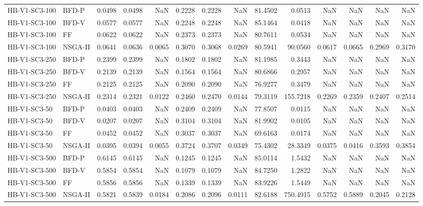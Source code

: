 \begin{tabular}{llrrrrrrrrrrrr}
HB-V1-SC3-100 & BFD-P & 0.0498 & 0.0498 & NaN & 0.2228 & 0.2228 & NaN & 81.4502 & 0.0513 & NaN & NaN & NaN & NaN \\
HB-V1-SC3-100 & BFD-V & 0.0577 & 0.0577 & NaN & 0.2248 & 0.2248 & NaN & 85.1464 & 0.0418 & NaN & NaN & NaN & NaN \\
HB-V1-SC3-100 & FF & 0.0622 & 0.0622 & NaN & 0.2373 & 0.2373 & NaN & 80.7611 & 0.0534 & NaN & NaN & NaN & NaN \\
HB-V1-SC3-100 & NSGA-II & 0.0641 & 0.0636 & 0.0065 & 0.3070 & 0.3068 & 0.0269 & 80.5941 & 90.0560 & 0.0617 & 0.0665 & 0.2969 & 0.3170 \\
HB-V1-SC3-250 & BFD-P & 0.2399 & 0.2399 & NaN & 0.1802 & 0.1802 & NaN & 81.1985 & 0.3443 & NaN & NaN & NaN & NaN \\
HB-V1-SC3-250 & BFD-V & 0.2139 & 0.2139 & NaN & 0.1564 & 0.1564 & NaN & 80.6866 & 0.2957 & NaN & NaN & NaN & NaN \\
HB-V1-SC3-250 & FF & 0.2125 & 0.2125 & NaN & 0.2090 & 0.2090 & NaN & 76.9277 & 0.3479 & NaN & NaN & NaN & NaN \\
HB-V1-SC3-250 & NSGA-II & 0.2314 & 0.2321 & 0.0122 & 0.2460 & 0.2470 & 0.0144 & 79.3119 & 155.7218 & 0.2269 & 0.2359 & 0.2407 & 0.2514 \\
HB-V1-SC3-50 & BFD-P & 0.0403 & 0.0403 & NaN & 0.2409 & 0.2409 & NaN & 77.8507 & 0.0115 & NaN & NaN & NaN & NaN \\
HB-V1-SC3-50 & BFD-V & 0.0207 & 0.0207 & NaN & 0.3104 & 0.3104 & NaN & 81.9902 & 0.0105 & NaN & NaN & NaN & NaN \\
HB-V1-SC3-50 & FF & 0.0452 & 0.0452 & NaN & 0.3037 & 0.3037 & NaN & 69.6163 & 0.0174 & NaN & NaN & NaN & NaN \\
HB-V1-SC3-50 & NSGA-II & 0.0395 & 0.0394 & 0.0055 & 0.3724 & 0.3707 & 0.0349 & 75.4302 & 28.3349 & 0.0375 & 0.0416 & 0.3593 & 0.3854 \\
HB-V1-SC3-500 & BFD-P & 0.6145 & 0.6145 & NaN & 0.1245 & 0.1245 & NaN & 85.0114 & 1.5432 & NaN & NaN & NaN & NaN \\
HB-V1-SC3-500 & BFD-V & 0.5854 & 0.5854 & NaN & 0.1079 & 0.1079 & NaN & 84.7250 & 1.2822 & NaN & NaN & NaN & NaN \\
HB-V1-SC3-500 & FF & 0.5856 & 0.5856 & NaN & 0.1339 & 0.1339 & NaN & 83.9226 & 1.5449 & NaN & NaN & NaN & NaN \\
HB-V1-SC3-500 & NSGA-II & 0.5821 & 0.5839 & 0.0184 & 0.2086 & 0.2096 & 0.0111 & 82.6188 & 750.4915 & 0.5752 & 0.5889 & 0.2045 & 0.2128 \\
\bottomrule
\end{tabular}
